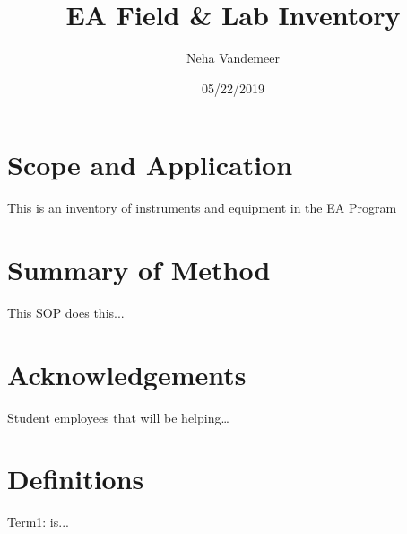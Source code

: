 \documentclass[12pt]{../SOP4_alpha}\usepackage[]{graphicx}\usepackage[]{color}
\title{EA Field \& Lab Inventory}
\date{05/22/2019}
\author{Neha Vandemeer}
\begin{document}
\maketitle

\section{Scope and Application}

\NP This is an inventory of instruments and equipment in the EA Program

\section{Summary of Method}

\NP This SOP does this...

\tableofcontents

\newpage

\section{Acknowledgements}

Student employees that will be helping\ldots

\section{Definitions}

\NP Term1: is...






\end{document}

